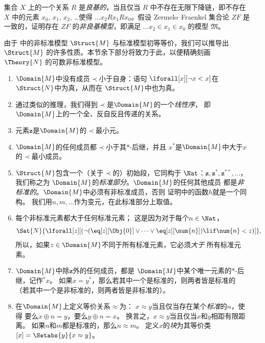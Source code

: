 \documentclass[../../../include/open-logic-section]{subfiles}
\begin{document}
\begin{prob}
集合 $X$ 上的一个关系 $R$ 是\emph{良基的}，当且仅当 $R$ 中不存在无限下降链，即不存在 $X$ 中的元素 $x_0$, $x_1$, $x_2$, \dots 使得 $\dots x_2Rx_1Rx_0$。假设 Zermelo–Fraenkel 集合论 $ZF$ 是一致的，证明存在 $ZF$ 的\emph{非良基模型}，即满足 $\dots x_2 \in x_1 \in x_0$ 的模型 $\mathfrak{M}$。
\end{prob}

由于  中的非标准模型 $\Struct{M}$ 与标准模型初等等价，我们可以推导出 $\Struct{M}$ 的许多性质。本节余下部分将致力于此，以便精确刻画 $\Theory{N}$ 的可数非标准模型。

\begin{enumerate}
\item $\Domain{M}$中没有成员$\prec$小于自身：语句
  $\lforall[x][\lnot x < x]$在$\Struct{N}$中为真，从而在
  $\Struct{M}$中也为真。
\item 通过类似的推理，我们得到$\prec$是$\Domain{M}$的一个\emph{线性序}，
  即$\Domain{M}$上的一个全、反自反且传递的关系。
\item 元素$\mathbf{z}$是$\Domain{M}$的$\prec$最小元。
\item $\Domain{M}$的任何成员都$\prec$小于其$*$-后继，并且
  $x^*$是$\Domain{M}$中大于$x$的$\prec$最小成员。
\item $\Struct{M}$包含一个（关于$\prec$的）初始段，它同构于
  $\Nat$：$\mathbf{z}, \mathbf{z}^*, \mathbf{z}^{**}, \dots$，我们称之为
  $\Domain{M}$的\emph{标准部分}。$\Domain{M}$的任何其他成员
  都是\emph{非标准的}。$\Domain{M}$中必须有非标准成员，否则
  证明中的函数$h$就是一个同构。
  我们用$n, m, \dots$作为变元，在此标准部分上取值。
\item 每个非标准元素都大于任何标准元素；
  这是因为对于每个$n \in \Nat$，
  \[
  \Sat{N}{\lforall[z][(\lnot(\eq[z][\Obj{0}] \lor
  \dots \lor \eq[z][\num{n}]) \lif \num{n} < z)]},
  \]
  所以，如果$z \in \Domain{M}$不同于所有标准元素，它必须\emph{大于}
  所有标准元素。
\item $\Domain{M}$中除$\mathbf{z}$外的任何成员，都是
  $\Domain{M}$中某个唯一元素的$*$-后继，记作$^*x$。
  如果$x = y^*$，那么若其中一个是标准的，则两者皆是标准的
  （若其中一个是非标准的，则两者皆是非标准的）。
\item 在$\Domain{M}$上定义等价关系$\approx$为：
  $x \approx y$当且仅当存在某个\emph{标准}的$n$，使得
  要么$x \oplus n = y$，要么$y \oplus n =x$。
  换言之，$x \approx y$当且仅当$x$和$y$相距有限距离。
  如果$n$和$m$都是标准的，那么$n \approx m$。
  定义$x$的\emph{块}为其等价类$[x] = \Setabs{y}{x
  \approx y}$。

\end{enumerate}
\end{document}
